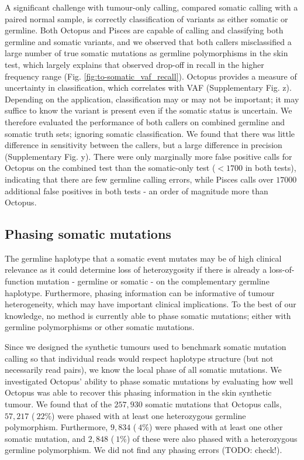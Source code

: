 \documentclass[notitlepage, twocolumn]{article}
\begin{document}
A significant challenge with tumour-only calling, compared somatic calling with a paired normal sample, is correctly classification of variants as either somatic or germline. Both Octopus and Pisces are capable of calling and classifying both germline and somatic variants, and we observed that both callers misclassified a large number of true somatic mutations as germline polymorphisms in the skin test, which largely explains that observed drop-off in recall in the higher frequency range (Fig. \ref{fig:to-somatic_vaf_recall}). Octopus provides a measure of uncertainty in classification, which correlates with VAF (Supplementary Fig. z). Depending on the application, classification may or may not be important; it may suffice to know the variant is present even if the somatic status is uncertain. We therefore evaluated the performance of both callers on combined germline and somatic truth sets; ignoring somatic classification. We found that there was little difference in sensitivity between the callers, but a large difference in precision (Supplementary Fig. y). There were only marginally more false positive calls for Octopus on the combined test than the somatic-only test ($<1700$ in both tests), indicating that there are few germline calling errors, while Pisces calls over $17000$ additional false positives in both tests - an order of magnitude more than Octopus.

\subsection*{Phasing somatic mutations}

The germline haplotype that a somatic event mutates may be of high clinical relevance as it could determine loss of heterozygosity if there is already a loss-of-function mutation - germline or somatic - on the complementary germline haplotype. Furthermore, phasing information can be informative of tumour heterogeneity, which may have important clinical implications. To the best of our knowledge, no method is currently able to phase somatic mutations; either with germline polymorphisms or other somatic mutations.

Since we designed the synthetic tumours used to benchmark somatic mutation calling so that individual reads would respect haplotype structure (but not necessarily read pairs), we know the local phase of all somatic mutations. We investigated Octopus' ability to phase somatic mutations by evaluating how well Octopus was able to recover this phasing information in the skin synthetic tumour. We found that of the $257,930$ somatic mutations that Octopus calls, $57,217$ ($~22\%$) were phased with at least one heterozygous germline polymorphism. Furthermore, $9,834$ ($~4\%$) were phased with at least one other somatic mutation, and $2,848$ ($~1\%$) of these were also phased with a heterozygous germline polymorphism. We did not find any phasing errors (TODO: check!).
\end{document}

